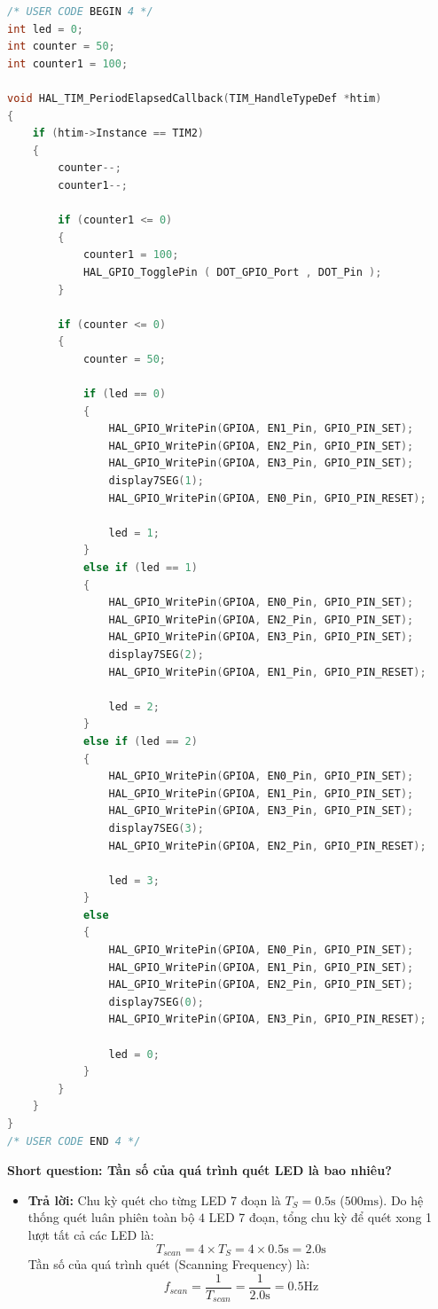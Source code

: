 \begin{lstlisting}[language=C, caption={Hàm ngắt Timer điều khiển quét 4 LED 7 đoạn và chớp tắt 2 LED DOT}, label={lst:lab2_ex2_code}]
/* USER CODE BEGIN 4 */
int led = 0;
int counter = 50;
int counter1 = 100;

void HAL_TIM_PeriodElapsedCallback(TIM_HandleTypeDef *htim)
{
    if (htim->Instance == TIM2)
    {
        counter--;
        counter1--;

        if (counter1 <= 0)
        {
        	counter1 = 100;
        	HAL_GPIO_TogglePin ( DOT_GPIO_Port , DOT_Pin );
        }

        if (counter <= 0)
        {
            counter = 50;

            if (led == 0)
            {
                HAL_GPIO_WritePin(GPIOA, EN1_Pin, GPIO_PIN_SET);
                HAL_GPIO_WritePin(GPIOA, EN2_Pin, GPIO_PIN_SET);
                HAL_GPIO_WritePin(GPIOA, EN3_Pin, GPIO_PIN_SET);
                display7SEG(1);
                HAL_GPIO_WritePin(GPIOA, EN0_Pin, GPIO_PIN_RESET);

                led = 1;
            }
            else if (led == 1)
            {
            	HAL_GPIO_WritePin(GPIOA, EN0_Pin, GPIO_PIN_SET);
            	HAL_GPIO_WritePin(GPIOA, EN2_Pin, GPIO_PIN_SET);
            	HAL_GPIO_WritePin(GPIOA, EN3_Pin, GPIO_PIN_SET);
                display7SEG(2);
                HAL_GPIO_WritePin(GPIOA, EN1_Pin, GPIO_PIN_RESET);

                led = 2;
            }
            else if (led == 2)
            {
            	HAL_GPIO_WritePin(GPIOA, EN0_Pin, GPIO_PIN_SET);
            	HAL_GPIO_WritePin(GPIOA, EN1_Pin, GPIO_PIN_SET);
            	HAL_GPIO_WritePin(GPIOA, EN3_Pin, GPIO_PIN_SET);
                display7SEG(3);
                HAL_GPIO_WritePin(GPIOA, EN2_Pin, GPIO_PIN_RESET);

                led = 3;
            }
            else
            {
            	HAL_GPIO_WritePin(GPIOA, EN0_Pin, GPIO_PIN_SET);
            	HAL_GPIO_WritePin(GPIOA, EN1_Pin, GPIO_PIN_SET);
            	HAL_GPIO_WritePin(GPIOA, EN2_Pin, GPIO_PIN_SET);
                display7SEG(0);
                HAL_GPIO_WritePin(GPIOA, EN3_Pin, GPIO_PIN_RESET);

                led = 0;
            }
        }
    }
}
/* USER CODE END 4 */

\end{lstlisting}

\vspace{0.3cm}

\textbf{Short question: Tần số của quá trình quét LED là bao nhiêu?}
\begin{itemize}
    \item \textbf{Trả lời:} 
    Chu kỳ quét cho từng LED 7 đoạn là $T_S = 0.5\text{s}$ ($500\text{ms}$). Do hệ thống quét luân phiên toàn bộ $4$ LED 7 đoạn, tổng chu kỳ để quét xong 1 lượt tất cả các LED là:
    $$T_{scan} = 4 \times T_S = 4 \times 0.5\text{s} = 2.0\text{s}$$
    Tần số của quá trình quét (Scanning Frequency) là:
    $$f_{scan} = \frac{1}{T_{scan}} = \frac{1}{2.0\text{s}} = 0.5\text{Hz}$$
\end{itemize}
